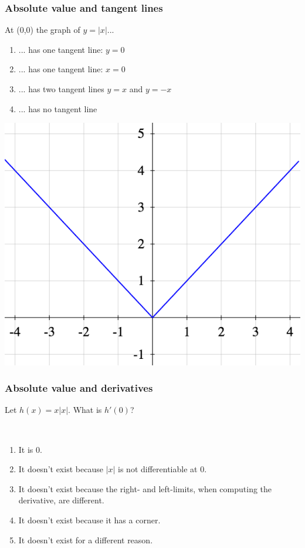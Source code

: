 \documentclass[14pt]{beamer}
\newcommand {\DS} [1] {${\displaystyle #1}$}
\begin{document}
\begin{frame}[t]
\frametitle{Absolute value and tangent lines}


At (0,0) the graph of \DS{y=|x|}...
	\begin{enumerate}
		\item ... has one tangent line: $y=0$
		\item ... has one tangent line: $x=0$
		\item ... has two tangent lines $y=x$ and $y=-x$
		\item ... has no tangent line
	\end{enumerate} 

\begin{center}
	\includegraphics[scale=.25]{G8}
\end{center}

\end{frame}

\begin{frame}[t]
\frametitle{Absolute value and derivatives}

	Let $h(x) = x|x|$.  What is $h'(0)$?

\
\begin{enumerate}
	\item It is 0.
	\item It doesn't exist because $|x|$ is not differentiable at $0$.
	\item It doesn't exist because the right- and left-limits, when computing the derivative, are different.
	\item  It doesn't exist because it has a corner.
	\item It doesn't exist for a different reason.
\end{enumerate}


\end{frame}
\end{document}
